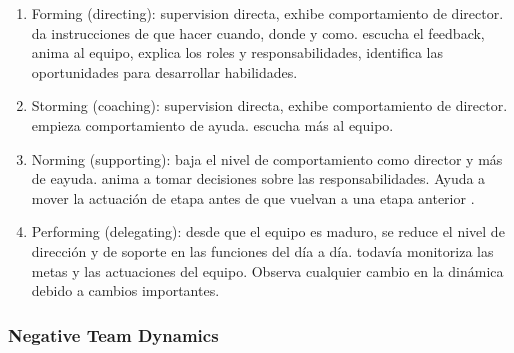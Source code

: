 \documentclass[]{article}
\begin{document}
\begin{enumerate}
	\item Forming (directing): supervision directa, exhibe comportamiento de director. da instrucciones de que hacer cuando, donde y como. escucha el feedback, anima al equipo, explica los roles y responsabilidades, identifica las oportunidades para desarrollar habilidades.
	\item Storming (coaching): supervision directa, exhibe comportamiento de director. empieza comportamiento de ayuda. escucha más al equipo.
	\item Norming (supporting): baja el nivel de comportamiento como director y más de eayuda. anima a tomar decisiones sobre las responsabilidades. Ayuda a mover la actuación de etapa antes de que vuelvan a una etapa anterior .
	\item Performing (delegating): desde que el equipo es maduro, se reduce el nivel de dirección y de soporte en las funciones del día a día. todavía monitoriza las metas y las actuaciones del equipo. Observa cualquier cambio en la dinámica debido a cambios importantes. 
\end{enumerate}

\subsubsection{Negative Team Dynamics}
\end{document}
